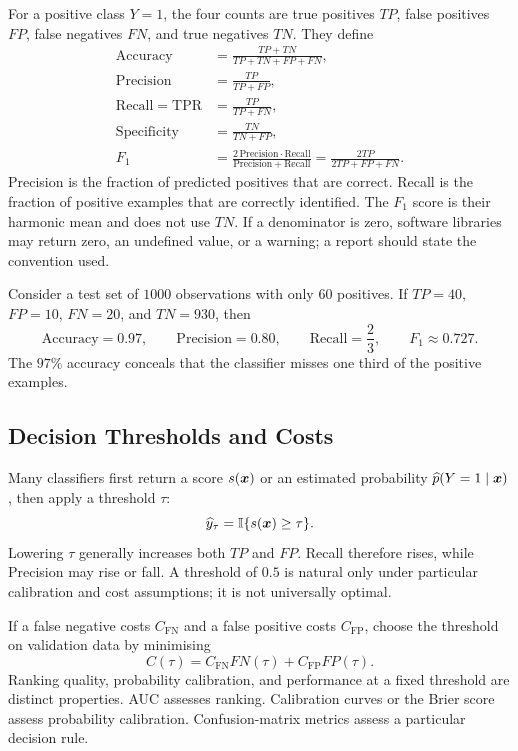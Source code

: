 For a positive class $Y=1$, the four counts are true positives $TP$, false positives $FP$, false negatives $FN$, and true negatives $TN$. They define
\begin{align*}
  \mathrm{Accuracy}
  &=\frac{TP+TN}{TP+TN+FP+FN},\\
  \mathrm{Precision}
  &=\frac{TP}{TP+FP},\\
  \mathrm{Recall}=\mathrm{TPR}
  &=\frac{TP}{TP+FN},\\
  \mathrm{Specificity}
  &=\frac{TN}{TN+FP},\\
  F_1
  &=\frac{2\,\mathrm{Precision}\cdot\mathrm{Recall}}
          {\mathrm{Precision}+\mathrm{Recall}}
    =\frac{2TP}{2TP+FP+FN}.
\end{align*}
Precision is the fraction of predicted positives that are correct. Recall is the fraction of positive examples that are correctly identified. The $F_1$ score is their harmonic mean and does not use $TN$. If a denominator is zero, software libraries may return zero, an undefined value, or a warning; a report should state the convention used.

\begin{examplebox}
Consider a test set of $1000$ observations with only $60$ positives. If
$TP=40$, $FP=10$, $FN=20$, and $TN=930$, then
\[
  \mathrm{Accuracy}=0.97,
  \qquad
  \mathrm{Precision}=0.80,
  \qquad
  \mathrm{Recall}=\frac23,
  \qquad
  F_1\approx0.727.
\]
The $97\%$ accuracy conceals that the classifier misses one third of the positive examples.
\end{examplebox}

\subsection{Decision Thresholds and Costs}

Many classifiers first return a score $s(\bm{x})$ or an estimated probability $\widehat p(Y=1\mid\bm{x})$, then apply a threshold $\tau$:
\[
  \widehat y_\tau=\mathbb{I}\{s(\bm{x})\geq\tau\}.
\]
Lowering $\tau$ generally increases both $TP$ and $FP$. Recall therefore rises, while Precision may rise or fall. A threshold of $0.5$ is natural only under particular calibration and cost assumptions; it is not universally optimal.

If a false negative costs $C_{\mathrm{FN}}$ and a false positive costs $C_{\mathrm{FP}}$, choose the threshold on validation data by minimising
\[
  C(\tau)
  =C_{\mathrm{FN}}FN(\tau)+C_{\mathrm{FP}}FP(\tau).
\]
Ranking quality, probability calibration, and performance at a fixed threshold are distinct properties. AUC assesses ranking. Calibration curves or the Brier score assess probability calibration. Confusion-matrix metrics assess a particular decision rule.

